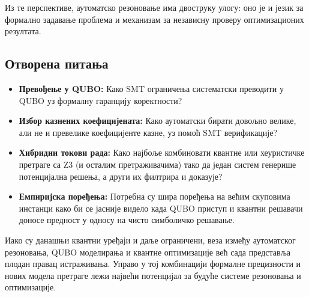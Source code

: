 Из те перспективе, аутоматско резоновање има двоструку улогу:
оно је и језик за формално задавање проблема и механизам за
независну проверу оптимизационих резултата.

\subsection*{Отворена питања}

\begin{itemize}[leftmargin=1.5em]
  \item \textbf{Превођење у QUBO:} Како SMT ограничења
        систематски преводити у QUBO уз формалну гаранцију
        коректности?
  \item \textbf{Избор казнених коефицијената:} Како аутоматски
        бирати довољно велике, али не и превелике коефицијенте
        казне, уз помоћ SMT верификације?
  \item \textbf{Хибридни токови рада:} Како најбоље комбиновати
        квантне или хеуристичке претраге са Z3 (и осталим претраживачима) тако да један систем
        генерише потенцијална решења, а други их филтрира и доказује?
  \item \textbf{Емпиријска поређења:} Потребна су шира поређења на
        већим скуповима инстанци како би се јасније видело када QUBO
        приступ и квантни решавачи доносе предност у односу на
        чисто симболичко решавање.
\end{itemize}

Иако су данашњи квантни уређаји и даље ограничени, веза између
аутоматског резоновања, QUBO моделирања и квантне оптимизације
већ сада представља плодан правац истраживања. Управо у тој
комбинацији формалне прецизности и нових модела претраге лежи
највећи потенцијал за будуће системе резоновања и оптимизације.
